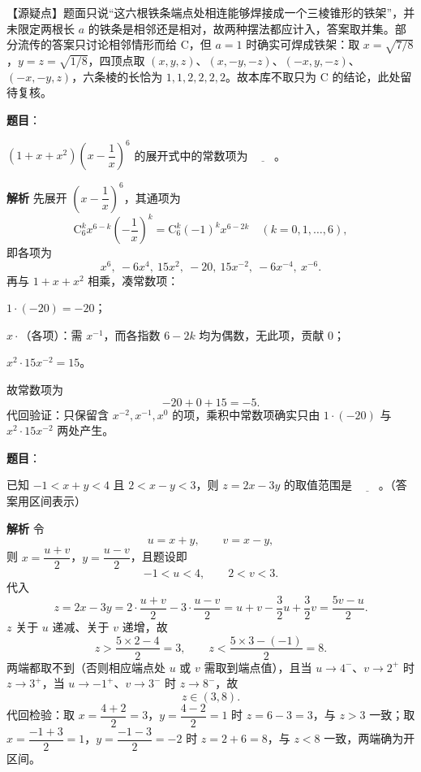 \begin{answer}
【源疑点】题面只说“这六根铁条端点处相连能够焊接成一个三棱锥形的铁架”，并未限定两根长 $a$ 的铁条是相邻还是相对，故两种摆法都应计入，答案取并集。部分流传的答案只讨论相邻情形而给 C，但 $a=1$ 时确实可焊成铁架：取 $x=\sqrt{7/8}$，$y=z=\sqrt{1/8}$，四顶点取 $\left(x,y,z\right)$、$\left(x,-y,-z\right)$、$\left(-x,y,-z\right)$、$\left(-x,-y,z\right)$，六条棱的长恰为 $1,1,2,2,2,2$。故本库不取只为 C 的结论，此处留待复核。


\end{answer}
\begin{answer}

\textbf{题目}：

$(1+x+x^2)\left(x-\dfrac1x\right)^6$ 的展开式中的常数项为 $\underline{\qquad}$。

\textbf{解析}
先展开 $\left(x-\dfrac1x\right)^6$，其通项为
\nopagebreak[4]
\[\mathrm C_6^k x^{6-k}\left(-\frac1x\right)^k=\mathrm C_6^k(-1)^kx^{6-2k}\quad(k=0,1,\dots,6),\]
即各项为
\nopagebreak[4]
\[x^6,\ -6x^4,\ 15x^2,\ -20,\ 15x^{-2},\ -6x^{-4},\ x^{-6}.\]
再与 $1+x+x^2$ 相乘，凑常数项：

$1\cdot(-20)=-20$；

$x\cdot$（各项）：需 $x^{-1}$，而各指数 $6-2k$ 均为偶数，无此项，贡献 $0$；

$x^2\cdot 15x^{-2}=15$。

故常数项为
\nopagebreak[4]
\[-20+0+15=-5.\]
代回验证：只保留含 $x^{-2},x^{-1},x^{0}$ 的项，乘积中常数项确实只由 $1\cdot(-20)$ 与 $x^2\cdot15x^{-2}$ 两处产生。


\end{answer}
\begin{answer}

\textbf{题目}：

已知 $-1<x+y<4$ 且 $2<x-y<3$，则 $z=2x-3y$ 的取值范围是 $\underline{\qquad}$。（答案用区间表示）

\textbf{解析}
令
\nopagebreak[4]
\[u=x+y,\qquad v=x-y,\]
则 $x=\dfrac{u+v}{2}$，$y=\dfrac{u-v}{2}$，且题设即
\nopagebreak[4]
\[-1<u<4,\qquad 2<v<3.\]
代入
\nopagebreak[4]
\[z=2x-3y=2\cdot\frac{u+v}{2}-3\cdot\frac{u-v}{2}
=u+v-\frac32u+\frac32v=\frac{5v-u}{2}.\]
$z$ 关于 $u$ 递减、关于 $v$ 递增，故
\nopagebreak[4]
\[z>\frac{5\times2-4}{2}=3,\qquad z<\frac{5\times3-(-1)}{2}=8.\]
两端都取不到（否则相应端点处 $u$ 或 $v$ 需取到端点值），且当 $u\to4^-$、$v\to2^+$ 时 $z\to3^+$，当 $u\to-1^+$、$v\to3^-$ 时 $z\to8^-$，故
\nopagebreak[4]
\[z\in(3,8).\]
代回检验：取 $x=\dfrac{4+2}{2}=3$，$y=\dfrac{4-2}{2}=1$ 时 $z=6-3=3$，与 $z>3$ 一致；取 $x=\dfrac{-1+3}{2}=1$，$y=\dfrac{-1-3}{2}=-2$ 时 $z=2+6=8$，与 $z<8$ 一致，两端确为开区间。


\end{answer}
